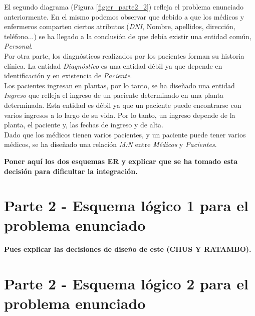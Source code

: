 \documentclass{article}
\begin{document}
El segundo diagrama (Figura \ref{fig:er_parte2_2}) refleja el problema enunciado anteriormente. En el mismo podemos observar que debido a que los médicos y enfermeros comparten ciertos atributos (\emph{DNI}, Nombre, apellidos, dirección, teléfono...) se ha llegado a la conclusión de que debía existir una entidad común, \emph{Personal}.\\
Por otra parte, los diagnósticos realizados por los pacientes forman su historia clínica. La entidad \emph{Diagnóstico} es una entidad débil ya que depende en identificación y en existencia de \emph{Paciente}.\\
Los pacientes ingresan en plantas, por lo tanto, se ha diseñado una entidad \emph{Ingreso} que refleja el ingreso de un paciente determinado en una planta determinada. Esta entidad es débil ya que un paciente puede encontrarse con varios ingresos a lo largo de su vida. Por lo tanto, un ingreso depende de la planta, el paciente y, las fechas de ingreso y de alta.\\
Dado que los médicos tienen varios pacientes, y un paciente puede tener varios médicos, se ha diseñado una relación \emph{M:N} entre \emph{Médicos} y \emph{Pacientes}.

\textbf{Poner aquí los dos esquemas ER y explicar que se ha tomado esta decisión para dificultar la integración.}

\section{Parte 2 - Esquema lógico 1 para el problema enunciado}

\textbf{Pues explicar las decisiones de diseño de este (CHUS Y RATAMBO).}

\section{Parte 2 - Esquema lógico 2 para el problema enunciado}
\end{document}
